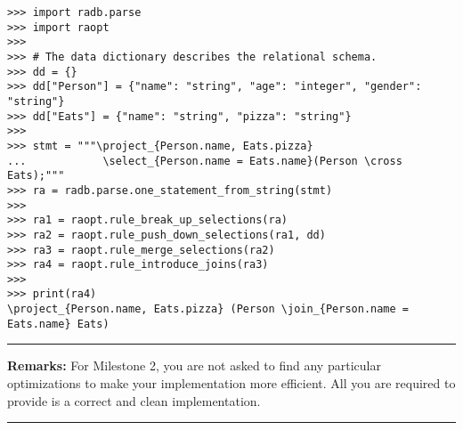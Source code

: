\documentclass[12pt]{exam}
\begin{document}
\begin{Verbatim}[frame=single,fontsize=\small]
>>> import radb.parse
>>> import raopt
>>>
>>> # The data dictionary describes the relational schema.
>>> dd = {}
>>> dd["Person"] = {"name": "string", "age": "integer", "gender": "string"}
>>> dd["Eats"] = {"name": "string", "pizza": "string"}
>>>
>>> stmt = """\project_{Person.name, Eats.pizza}
...            \select_{Person.name = Eats.name}(Person \cross Eats);"""
>>> ra = radb.parse.one_statement_from_string(stmt)
>>>
>>> ra1 = raopt.rule_break_up_selections(ra)
>>> ra2 = raopt.rule_push_down_selections(ra1, dd)
>>> ra3 = raopt.rule_merge_selections(ra2)
>>> ra4 = raopt.rule_introduce_joins(ra3)
>>>
>>> print(ra4)
\project_{Person.name, Eats.pizza} (Person \join_{Person.name = Eats.name} Eats)
\end{Verbatim}


\bigskip
\noindent
\rule{\linewidth}{0.5mm}

{\bf Remarks:}
For Milestone 2, you are not asked to find any particular optimizations to make your implementation more efficient. All you are required to provide is a correct and clean implementation.

\noindent
\rule{\linewidth}{0.5mm}
\end{document}
